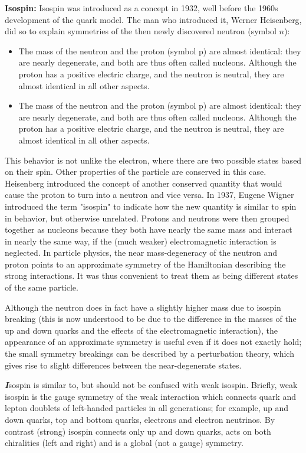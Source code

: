 \documentclass[10pt,a4paper]{article}
\newcounter{theo}
\newenvironment{callout}
	{\begin{calloutbox}\color{charcoal}\textbf\textit}
	{\end{calloutbox}}
\begin{document}
\textbf{Isospin:} Isospin was introduced as a concept in 1932, well before the 1960s development of the quark model. The man who introduced it, Werner Heisenberg, did so to explain symmetries of the then newly discovered neutron (symbol $n$):
\begin{itemize}
    \item The mass of the neutron and the proton (symbol p) are almost identical: they are nearly degenerate, and both are thus often called nucleons. Although the proton has a positive electric charge, and the neutron is neutral, they are almost identical in all other aspects.
    \item The mass of the neutron and the proton (symbol p) are almost identical: they are nearly degenerate, and both are thus often called nucleons. Although the proton has a positive electric charge, and the neutron is neutral, they are almost identical in all other aspects.
\end{itemize}

This behavior is not unlike the electron, where there are two possible states based on their spin. Other properties of the particle are conserved in this case. Heisenberg introduced the concept of another conserved quantity that would cause the proton to turn into a neutron and vice versa. In 1937, Eugene Wigner introduced the term "isospin" to indicate how the new quantity is similar to spin in behavior, but otherwise unrelated. Protons and neutrons were then grouped together as nucleons because they both have nearly the same mass and interact in nearly the same way, if the (much weaker) electromagnetic interaction is neglected. In particle physics, the near mass-degeneracy of the neutron and proton points to an approximate symmetry of the Hamiltonian describing the strong interactions. It was thus convenient to treat them as being different states of the same particle.

Although the neutron does in fact have a slightly higher mass due to isospin breaking (this is now understood to be due to the difference in the masses of the up and down quarks and the effects of the electromagnetic interaction), the appearance of an approximate symmetry is useful even if it does not exactly hold; the small symmetry breakings can be described by a perturbation theory, which gives rise to slight differences between the near-degenerate states.
\begin{callout}
    Isospin is similar to, but should not be confused with weak isospin. Briefly, weak isospin is the gauge symmetry of the weak interaction which connects quark and lepton doublets of left-handed particles in all generations; for example, up and down quarks, top and bottom quarks, electrons and electron neutrinos. By contrast (strong) isospin connects only up and down quarks, acts on both chiralities (left and right) and is a global (not a gauge) symmetry.
\end{callout}
\end{document}
